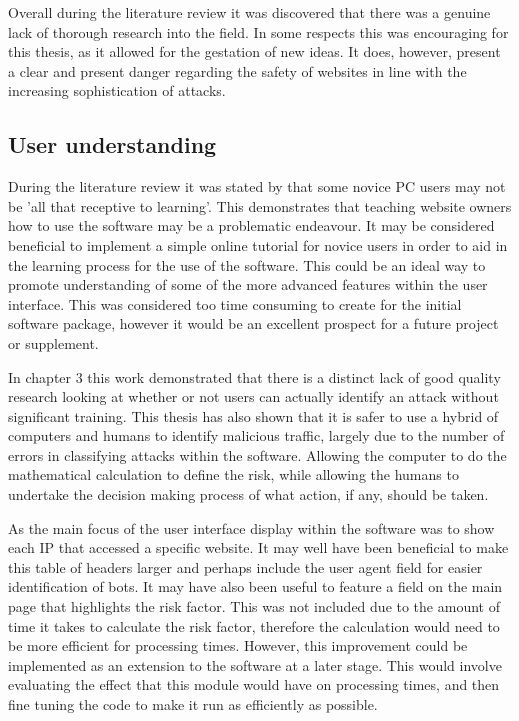 Overall during the literature review it was discovered that there was a genuine lack of thorough research into the field. In some respects this was encouraging for this thesis, as it allowed for the gestation of new ideas. It does, however, present a clear and present danger regarding the safety of websites in line with the increasing sophistication of attacks.


\subsection{User understanding}

During the literature review it was stated by \citeauthor{cranor2008framework} that some novice PC users may not be 'all that receptive to learning'. This demonstrates that teaching website owners how to use the software may be a problematic endeavour. It may be considered beneficial to implement a simple online tutorial for novice users in order to aid in the learning process for the use of the software. This could be an ideal way to promote understanding of some of the more advanced features within the user interface. This was considered too time consuming to create for the initial software package, however it would be an excellent prospect for a future project or supplement.

In chapter 3 this work demonstrated that there is a distinct lack of good quality research looking at whether or not users can actually identify an attack without significant training. This thesis has also shown that it is safer to use a hybrid of computers and humans to identify malicious traffic, largely due to the number of errors in classifying attacks within the software. Allowing the computer to do the mathematical calculation to define the risk, while allowing the humans to undertake the decision making process of what action, if any, should be taken.

As the main focus of the user interface display within the software was to show each IP that accessed a specific website. It may well have been beneficial to make this table of headers larger and perhaps include the user agent field for easier identification of bots. It may have also been useful to feature a field on the main page that highlights the risk factor. This was not included due to the amount of time it takes to calculate the risk factor, therefore the calculation would need to be more efficient for processing times. However, this improvement could be implemented as an extension to the software at a later stage. This would involve evaluating the effect that this module would have on processing times, and then fine tuning the code to make it run as efficiently as possible.
